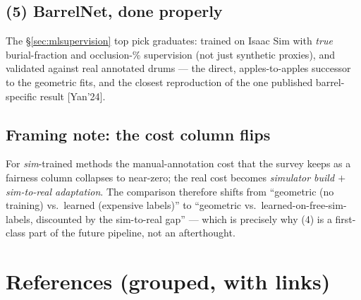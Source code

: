 \documentclass[10pt,a4paper]{article}
\begin{document}
\subsection{(5) BarrelNet, done properly}
The \S\ref{sec:mlsupervision} top pick graduates: trained on Isaac Sim with \emph{true}
burial-fraction and occlusion-\% supervision (not just synthetic proxies), and validated
against real annotated drums --- the direct, apples-to-apples successor to the geometric fits,
and the closest reproduction of the one published barrel-specific result [Yan'24].

\subsection{Framing note: the cost column flips}
For \emph{sim}-trained methods the manual-annotation cost that the survey keeps as a fairness
column collapses to near-zero; the real cost becomes \emph{simulator build $+$ sim-to-real
adaptation}. The comparison therefore shifts from ``geometric (no training) vs.\ learned
(expensive labels)'' to ``geometric vs.\ learned-on-free-sim-labels, discounted by the
sim-to-real gap'' --- which is precisely why (4) is a first-class part of the future pipeline,
not an afterthought.

\section{References (grouped, with links)}
\end{document}
